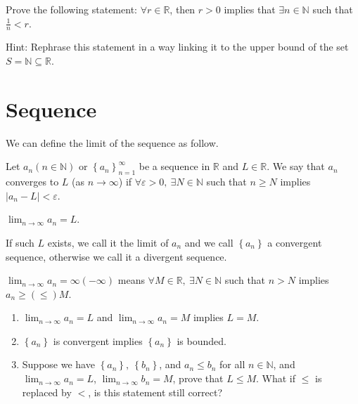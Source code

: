 \begin{theorem}\label{thm: Archimedean}
	Prove the following statement: \(\forall r \in \mathbb{R} \), then \(r > 0\) implies that \(\exists n \in \mathbb{N} \) such that \(\frac{1}{n} < r\).    
\end{theorem}
Hint: Rephrase this statement in a way linking it to the upper bound of the set \(S = \mathbb{N} \subseteq \mathbb{R}\). 

\section{Sequence}
\begin{definition*}
	We can define the limit of the sequence as follow.
\begin{definition}
		Let \(a_n (n \in \mathbb{N} )\) or \(\left\{ a_n \right\}_{n=1}^{\infty}  \) be a sequence in \(\mathbb{R} \) and \(L \in \mathbb{R} \). We say that \(a_n\) converges to \(L\) (as \(n \to \infty \)) if \(\forall \varepsilon > 0, \ \exists N \in \mathbb{N} \) such that \(n \ge N\) implies \(\left\vert a_n - L \right\vert < \varepsilon  \). 
\end{definition}    

\begin{notation}
	\(\lim_{n \to \infty} a_n = L \). 
\end{notation}

\begin{note}
	If such \(L\) exists, we call it the limit of \(a_n\) and we call \(\left\{ a_n \right\} \) a convergent sequence, otherwise we call it a divergent sequence.   
\end{note}

\begin{definition}
	\(\lim_{n \to \infty} a_n = \infty (-\infty )  \) means \(\forall M \in \mathbb{R} , \ \exists N \in \mathbb{N} \) such that \(n > N\) implies \(a_n \ge (\le) M\).  
\end{definition}
\end{definition*}

\begin{exercise}
\begin{enumerate}	
	\item 	\(\lim_{n \to \infty} a_n = L \) and \(\lim_{n \to \infty} a_n = M\) implies \(L=M\).  
	\item \(\left\{ a_n \right\} \) is convergent implies \(\left\{ a_n \right\} \) is bounded.  
	\item Suppose we have \(\left\{ a_n \right\}, \ \left\{ b_n \right\}  \), and \(a_n \le b_n\) for all \(n \in \mathbb{N} \), and \(\lim_{n \to \infty} a_n = L \), \(\lim_{n \to \infty} b_n = M \), prove that \(L \le M\). What if \(\le\) is replaced by \(<\), is this statement still correct?  
\end{enumerate} 
\end{exercise}

